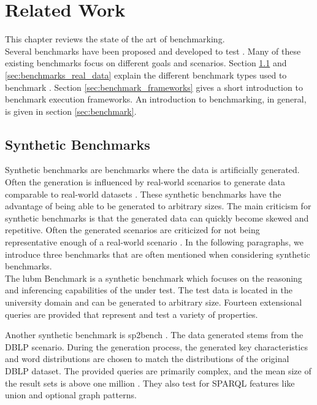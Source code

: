 \chapter{Related Work}
\label{ch:related_work}

This chapter reviews the state of the art of \ts{} benchmarking.\\

Several benchmarks have been proposed and developed to test \tsp{} \cite{alucDiversifiedStressTesting2014, guoLUBMBenchmarkOWL2005, morseyDBpediaSPARQLBenchmark2011, saleemFEASIBLEFeatureBasedSPARQL2015, schmidtSP2BenchSPARQLPerformance2008}.
Many of these existing benchmarks focus on different goals and scenarios.
Section \ref{sec:synthetic_benchmarks} and \ref{sec:benchmarks_real_data} explain the different benchmark types used to benchmark \tsp{}.
Section \ref{sec:benchmark_frameworks} gives a short introduction to benchmark execution frameworks.
An introduction to benchmarking, in general, is given in section \ref{sec:benchmark}.

\section{Synthetic Benchmarks}
\label{sec:synthetic_benchmarks}
Synthetic benchmarks are benchmarks where the data is artificially generated.
Often the generation is influenced by real-world scenarios to generate data comparable to real-world datasets \cite{guoLUBMBenchmarkOWL2005}.
These synthetic benchmarks have the advantage of being able to be generated to arbitrary sizes.
The main criticism for synthetic benchmarks is that the generated data can quickly become skewed and repetitive.
Often the generated scenarios are criticized for not being representative enough of a real-world scenario \cite{saleemFEASIBLEFeatureBasedSPARQL2015}.
In the following paragraphs, we introduce three benchmarks that are often mentioned when considering synthetic \ts{} benchmarks.
\\

The \ac{lubm} Benchmark \cite{guoLUBMBenchmarkOWL2005} is a synthetic benchmark which focuses on the reasoning and inferencing capabilities of the \tsp{} under test.
The test data is located in the university domain and can be generated to arbitrary size.
Fourteen extensional queries are provided that represent and test a variety of properties.

Another synthetic benchmark is \ac{sp2bench} \cite{schmidtSP2BenchSPARQLPerformance2008}.
The data generated stems from the DBLP scenario. 
During the generation process, the generated key characteristics and word distributions are chosen to match the distributions of the original DBLP dataset.
The provided queries are primarily complex, and the mean size of the result sets is above one million \cite{saleemFEASIBLEFeatureBasedSPARQL2015}.
They also test for SPARQL features like union and optional graph patterns.


